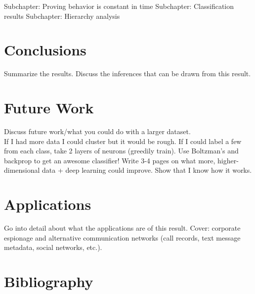 \documentclass[12pt,dvips]{report}
\begin{document}
Subchapter: Proving behavior is constant in time
Subchapter: Classification results
Subchapter: Hierarchy analysis

\chapter{Conclusions}
Summarize the results.  Discuss the inferences that can be drawn from this result. 

\chapter{Future Work}
Discuss future work/what you could do with a larger dataset.
\\If I had more data I could cluster but it would be rough.  If I could label a few from each class, take 2 layers of neurons (greedily train).  Use Boltzman's and backprop to get an awesome classifier!  Write 3-4 pages on what more, higher-dimensional data + deep learning could improve.  Show that I know how it works.


\chapter{Applications}
Go into detail about what the applications are of this result.  Cover: corporate espionage and alternative communication networks (call records, text message metadata, social networks, etc.).


%
%

%



%
\chapter*{Bibliography}


\end{document}
